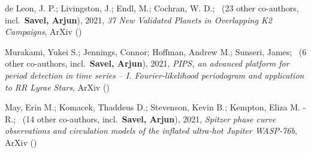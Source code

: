 \item[{\color{numcolor}\scriptsize3}] de Leon, J. P.; Livingston, J.; Endl, M.; Cochran, W. D.; \etal\ ({23} other co-authors, incl.\ \textbf{Savel, Arjun}), 2021, \emph{37 New Validated Planets in Overlapping K2 Campaigns}, ArXiv ()

\item[{\color{numcolor}\scriptsize2}] Murakami, Yukei S.; Jennings, Connor; Hoffman, Andrew M.; Sunseri, James; \etal\ ({6} other co-authors, incl.\ \textbf{Savel, Arjun}), 2021, \emph{PIPS, an advanced platform for period detection in time series -- I. Fourier-likelihood periodogram and application to RR Lyrae Stars}, ArXiv ()

\item[{\color{numcolor}\scriptsize1}] May, Erin M.; Komacek, Thaddeus D.; Stevenson, Kevin B.; Kempton, Eliza M. -R.; \etal\ ({14} other co-authors, incl.\ \textbf{Savel, Arjun}), 2021, \emph{Spitzer phase curve observations and circulation models of the inflated ultra-hot Jupiter WASP-76b}, ArXiv ()